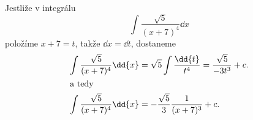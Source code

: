 \begin{mdframed}[style=mdexam]
  \begin{example}\label{mai:exam139}
    Jestliže v integrálu
    \begin{equation*}
      \int\dfrac{\sqrt{5}}{(x+7)^4}\dd{x}
    \end{equation*}
    položíme \(x+7 = t\), takže \(\dd{x} = \dd{t}\), dostaneme
    \begin{align*}
      \int\dfrac{\sqrt{5}}{(x+7)^4}\dd{x} &= 
      \sqrt{5}\int\dfrac{\dd{t}}{t^4} = \dfrac{\sqrt{5}}{-3t^3} + c.   \\
      \shortintertext{a tedy}
      \int\dfrac{\sqrt{5}}{(x+7)^4}\dd{x} &= -\dfrac{\sqrt{5}}{3}\dfrac{1}{(x+7)^3} + c.
    \end{align*}  
  \end{example}
\end{mdframed}